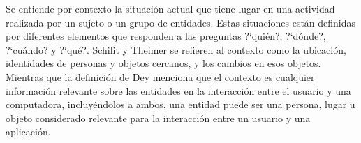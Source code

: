 Se entiende por contexto la situaci\'on actual que tiene lugar en una actividad realizada por un sujeto o un grupo de entidades. Estas situaciones est\'an definidas por diferentes elementos que responden a las preguntas ?`qui\'en?, ?`d\'onde?, ?`cu\'ando? y ?`qu\'e?. Schilit y Theimer \cite{schillit1994disseminating} se refieren al contexto como la ubicaci\'on, identidades de personas y objetos cercanos, y los cambios en esos objetos. Mientras que la definici\'on de Dey \cite{dey2001conceptual} menciona que el contexto es cualquier informaci\'on relevante sobre las entidades en la interacci\'on entre el usuario y una computadora, incluy\'endolos a ambos, una entidad puede ser una persona, lugar u objeto considerado relevante para la interacci\'on entre un usuario y una aplicaci\'on.
